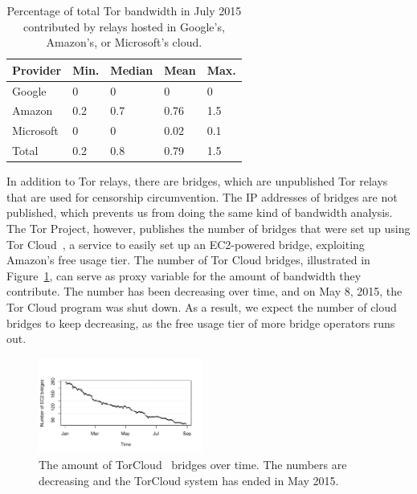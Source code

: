 \begin{table}[t]
	\centering
	\begin{tabular}{lllll}
	Provider & Min. & Median & Mean & Max. \\
	\hline
	Google & 0 & 0 & 0 & 0 \\
	Amazon & 0.2 & 0.7 & 0.76 & 1.5 \\
	Microsoft & 0 & 0 & 0.02 & 0.1 \\
	\hline
	Total & 0.2 & 0.8 & 0.79 & 1.5 \\
	\end{tabular}
	\caption{Percentage of total Tor bandwidth in July 2015 contributed by
	relays hosted in Google's, Amazon's, or Microsoft's cloud.}
	\label{tab:bwfraction}
\end{table}

In addition to Tor relays, there are bridges, which are unpublished Tor relays
that are used for censorship circumvention.  The IP addresses of bridges are
not published, which prevents us from doing the same kind of bandwidth
analysis.  The Tor Project, however, publishes the number of bridges that were
set up using Tor Cloud~\cite{torcloud}, a service to easily set up an
EC2-powered bridge, exploiting Amazon's free usage tier.  The number of Tor
Cloud bridges, illustrated in Figure~\ref{fig:cloudbridges}, can serve as proxy
variable for the amount of bandwidth they contribute.  The number has been
decreasing over time, and on May 8, 2015, the Tor Cloud program was shut down.
As a result, we expect the number of cloud bridges to keep decreasing, as the
free usage tier of more bridge operators runs out.

\begin{figure}[t]
	\centering
	\includegraphics[width=0.48\textwidth]{diagrams/torcloud.pdf}
	\caption{The amount of TorCloud~\cite{torcloud} bridges over time.  The
	numbers are decreasing and the TorCloud system has ended in May 2015.}
	\label{fig:cloudbridges}
\end{figure}
